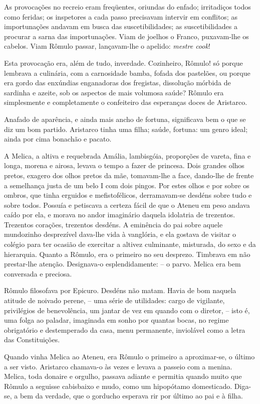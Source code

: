 As provocações no recreio eram freqüentes, oriundas do
enfado; irritadiços todos como feridas; os inspetores a cada passo
precisavam intervir em conflitos; as importunações andavam em busca das
suscetibilidades; as suscetibilidades a procurar a sarna das
importunações. Viam de joelhos o Franco, puxavam{}-lhe os cabelos. Viam
Rômulo passar, lançavam{}-lhe o apelido: \textit{mestre cook}! 

Esta provocação
era, além de tudo, inverdade. Cozinheiro, Rômulo! só porque lembrava a
culinária, com a carnosidade bamba, fofada dos pastelões, ou porque era
gordo das enxúndias enganadoras dos fregistas, dissolução mórbida de
sardinha e azeite, sob os aspectos de mais volumosa saúde? Rômulo era
simplesmente e completamente o confeiteiro das esperanças doces de
Aristarco. 

Anafado de aparência, e ainda mais ancho de fortuna,
significava bem o que se diz um bom partido. Aristarco tinha uma filha;
saúde, fortuna: um genro ideal; ainda por cima bonachão e pacato. 

A Melica, a altiva e requebrada Amália, lambisgóia, proporções de vareta,
fina e longa, morena e airosa, levava o tempo a fazer de princesa. Dois
grandes olhos pretos, exagero dos olhos pretos da mãe, tomavam{}-lhe a
face, dando{}-lhe de frente a semelhança justa de um belo I com dois
pingos. Por estes olhos e por sobre os ombros, que tinha erguidos e
mefistofélicos, derramavam{}-se desdéns sobre tudo e sobre todos.
Possuía e petiscava a certeza fácil de que o Ateneu em peso andava
caído por ela, e morava no andor imaginário daquela idolatria de trezentos. 
Trezentos corações, trezentos desdéns. A eminência do pai sobre aquele mundozinho
desprezível dava{}-lhe vida à vanglória, e ela gostava de visitar o
colégio para ter ocasião de exercitar a altivez culminante, misturada,
do sexo e da hierarquia. Quanto a Rômulo, era o primeiro no seu
desprezo. Timbrava em não prestar{}-lhe atenção. Designava{}-o
esplendidamente: -- o parvo. Melica era bem conversada e preciosa.

Rômulo filosofava por Epicuro. Desdéns não matam. Havia de bom naquela
atitude de noivado perene, -- uma série de utilidades: cargo de
vigilante, privilégios de benevolência, um jantar de vez em quando com
o diretor, -- isto é, uma folga ao paladar, imaginada em sonho por
quantas bocas, no regime obrigatório e destemperado da casa, menu
permanente, inviolável como a letra das Constituições. 

Quando vinha Melica ao Ateneu, era Rômulo o primeiro a aproximar{}-se, 
o último a ser visto. Aristarco chamava{}-o às vezes e levava a passeio com a
menina. Melica, toda donaire e orgulho, passava adiante e permitia
quando muito que Rômulo a seguisse cabisbaixo e mudo, como um
hipopótamo domesticado. Diga{}-se, a bem da verdade, que o gorducho
esperava rir por último ao pai e à filha. 

